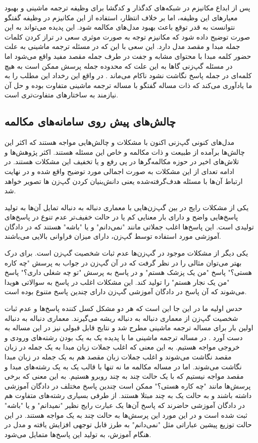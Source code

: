 پس از ابداع مکانیزم
در شبکه‌های کدگذار و کدگشا برای وظیفه ترجمه ماشینی و بهبود معیار‌های این وظیفه، اما بر خلاف انتظار، استفاده از این مکانیزم در وظیفه گفتگو نتوانست به قدر توقع باعث بهبود مدل‌های مکالمه شود. این پدیده می‌تواند به این صورت توضیح داده‌ شود که مکانیزم توجه به صورت موثری سعی در تراز کردن کلمات جمله مبدا و مقصد مدل دارد. این سعی با این که در مسئله ترجمه ماشینی به علت حضور کلمه مبدا با محتوای مشابه و جفت در طرف جمله مقصد مفید واقع می‌شود اما در مسئله گپ‌زنی گاها به این علت که محدوده جمله پرسش ممکن است به هیچ کلمه‌ای در جمله پاسخ نگاشت نشود ناکام می‌ماند
\cite{Gao_Neural_Approaches}.
در واقع این رخداد این مطلب را به ما یادآوری می‌کند که ذات مساله گفتگو با مساله ترجمه ماشینی متفاوت بوده و حل آن نیازمند به ساختارهای متفاوت‌تری است.

\subsection{چالش‌های پیش روی سامانه‌های مکالمه}
مدل‌های کنونی گپ‌زنی اکنون با مشکلات و چالش‌هایی مواجه هستند که اکثر این چالش‌ها برآمده از طبیعت و ذات مکالمه و خاص این مسئله هستند. اکثر پژوهش‌ها و تلاش‌های اخیر در حوزه مکالمه‌گرها در پی رفع و یا تخفیف این مشکلات هستند. در ادامه تعدای از این مشکلات 
به صورت اجمالی مورد توضیح واقع شده و در نهایت ارتباط آن‌ها با مسئله هدف‌گرفته‌شده یعنی دانش‌بنیان کردن گپ‌زن ها تصویر خواهد شد.

یکی از مشکلات رایج در بین گپ‌زن‌هایی با معماری دنباله به دنباله تمایل آن‌ها به تولید پاسخ‌هایی واضح و دارای بار معنایی کم یا در حالت  خفیف‌تر عدم تنوع در پاسخ‌های تولیدی است. این پاسخ‌ها اغلب جملاتی مانند 
"نمی‌دانم" و یا "باشه" هستند که در دادگان آموزشی مورد استفاده توسط گپ‌زن، دارای میزان فراوانی بالایی می‌باشند.

یکی دیگر از مشکلات موجود در گپ‌زن‌ها عدم ثبات شخصیت گپ‌زن است. برای درک بهتر می‌توان مثالی را در نظر گرفت که در آن گپ‌زن در جواب به پرسش "چه کاره هستی؟" پاسخ "من یک پزشک هستم" و در پاسخ به پرسش "تو چه شغلی داری؟" پاسخ "من یک نجار هستم" را تولید کند. این مشکلات اغلب در پاسخ به سوالاتی هویدا می‌شوند که آن پاسخ در دادگان آموزشی گپ‌زن دارای چندین پاسخ متنوع بوده است.

حدس اولیه ما در این جا این است که هر دو مشکل کسل کننده پاسخ‌ها و عدم ثبات شخصیت گپ‌زن از معماری دنباله به دنباله ریشه می‌گیرند. معماری دنباله به دنباله اولین بار برای مساله ترجمه ماشینی مطرح شد و نتایج قابل قبولی نیز در این مساله به دست آورد
\cite{seq2seq_paper}.
در مساله ترجمه ماشینی ما با پدیده یک به یک بودن رشته‌های ورودی و خروجی مواجه هستیم. به این معنی که اغلب جملات زبان مبدا به یک جمله در زبان مقصد نگاشت می‌شوند و اغلب جملات زبان مقصد هم به یک جمله در زبان مبدا نگاشت می‌شوند. اما در مساله مکالمه ما نه تنها با قالب یک به یک رشته‌های مبدا و مقصد مواجه نیستیم که با یک حالت چند به چند روبرو هستیم. به این معنی که برخی پرسش‌ها مانند "چه کاره هستی؟" ممکن است چندین پاسخ مختلف در دادگان آموزشی داشته باشند و به حالت یک به چند مبتلا هستند. از طرفی بسیاری رشته‌های متفاوت هم در دادگان آموزشی حاضرند که پاسخ آن‌ها یک عبارت رایج نظیر "نمیدانم" و یا "باشه" ثبت شده است و در این مورد این پرسش‌ها به حالت چند به یک مواجه هستند. در این حالت توزیع پیشین  عباراتی مثل "نمی‌دانم" به طرز قابل توجهی افزایش یافته و مدل در هنگام آموزش، به تولید این پاسخ‌ها متمایل می‌شود.

